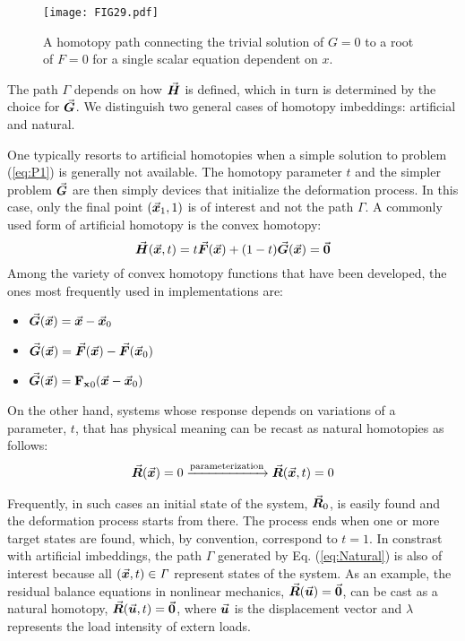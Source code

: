 \begin{figure}[t]
	\centering
	\texttt{[image: FIG29.pdf]}
	\caption{A homotopy path connecting the trivial solution of $G=0$ 
		to a root of $F=0$ for a single scalar equation dependent on $x$.}
	\label{fig:FIG29}
\end{figure}
The path $\mathit{\Gamma}$ depends on how $\vec{\bm{H}}$ is defined, which in turn 
is determined by the choice for $\vec{\bm{G}}$. We distinguish two general
cases of homotopy imbeddings: artificial and natural.

One typically resorts to artificial homotopies when a simple solution to problem
(\ref{eq:P1}) is generally not available. The homotopy parameter
$t$ and the simpler problem $\vec{\bm{G}}$ are then simply devices that
initialize the deformation process. In this
case, only the final point $(\vec{\bm{x}}_1,1)$ is of interest and not the path
$\mathit{\Gamma}$. A commonly used form
of artificial homotopy is the convex homotopy: 
\begin{equation}
	\vec{\bm{H}}(\vec{\bm{x}},t) = t\vec{\bm{F}}(\vec{\bm{x}})+(1-t)\vec{\bm{G}}(\vec{\bm{x}})=\vec{\bm{0}}
	\label{eq:homotopy1}
\end{equation}
Among the variety of convex homotopy functions that have been
developed, the ones most frequently used in implementations are:
\begin{itemize}
	\item{
		$\vec{\bm{G}}(\vec{\bm{x}})=\vec{\bm{x}}-\vec{\bm{x}}_0$}
	\cite{Chow:1978,Watson:2002}
	\item{ $\vec{\bm{G}}(\vec{\bm{x}}) =
		\vec{\bm{F}}(\vec{\bm{x}})-\vec{\bm{F}}(\vec{\bm{x}}_0)$}
	\cite{Keller:1978,Smale:1976}
	\item{ $\vec{\bm{G}}(\vec{\bm{x}}) =
		\mathbf{F_x}_0(\vec{\bm{x}}-\vec{\bm{x}}_0)$}\ \cite{Garcia:1980,Wayburn:1987}
\end{itemize}
On the other hand, systems whose response depends on
variations of a parameter, $t$, that has physical meaning can be recast as 
natural homotopies as follows:
\begin{gather}
	\vec{\bm{R}}(\vec{\bm{x}})=0 \xrightarrow{\text{parameterization}} 
	\vec{\bm{R}}(\vec{\bm{x}},t)=0
	\label{eq:Natural}
\end{gather}

Frequently, in such cases an initial state of the system, $\vec{\bm{R}}_0$, is
easily found and the deformation process starts from there. The
process ends when one or more target states are found, which, by convention, 
correspond to $t=1$. In constrast with artificial imbeddings, the path
$\mathit{\Gamma}$ generated by Eq. (\ref{eq:Natural}) is also of interest
because all $(\vec{\bm{x}},t)\in\mathit{\Gamma}$ represent states of the
system. As an example, the residual balance equations in nonlinear mechanics, 
$\vec{\bm{R}}(\vec{\bm{u}})=\vec{\bm{0}}$, can be cast as a natural homotopy,
$\vec{\bm{R}}(\vec{\bm{u}},t)=\vec{\bm{0}}$, where $\vec{\bm{u}}$ is the displacement vector 
and $\lambda$ represents the load intensity of extern loads.

